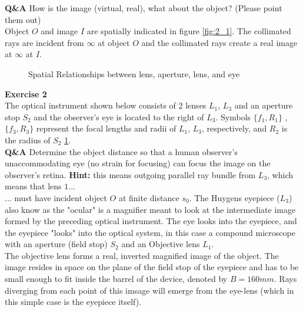 \documentclass[main.tex]{subfiles}
\begin{document}
\textbf{Q\&A} How is the image (virtual, real), what about the object? (Please point them out)\\

Object $O$ and image $I$ are spatially indicated in figure \ref{fig:2_1}. The collimated rays are incident from $\infty$ at object $O$ and the collimated rays create a real image at $\infty$ at $I$. 


\newpage

\begin{figure}
\centering{}
\caption{Spatial Relationships between lens, aperture, lens, and eye}
\label{fig:2_2}
\end{figure}

\textbf{Exercise 2}\\
The optical instrument shown below consists of 2 lenses $L_1$, $L_3$ and an aperture stop $S_2$ and the observer's eye is located to the right of $L_3$. Symbols $\{f_1 , R_1\}$ , $\{f_3 , R_3\}$ represent the focal lengths and radii of $L_1$, $L_3$, respectively, and $R_2$ is the radius of $S_2$ \ref{fig:2_2}.\\

\textbf{Q\&A} Determine the object distance so that a human observer's unaccommodating eye (no strain for focusing) can focus the image on the observer's retina. \textbf{Hint:} this means outgoing parallel ray bundle from $L_3$, which means that lens $1 ...$\\

... must have incident object $O$ at finite distance $s_0$. The Huygens eyepiece ($L_3$) also know as the "ocular" is a magnifier meant to look at the intermediate image formed by the preceding optical instrument. The eye looks into the eyepiece, and the eyepiece "looks" into the optical system, in this case a compound microscope with an aperture (field stop) $S_2$ and an Objective lens $L_1$.\\

The objective lens forms a real, inverted magnified image of the object. The image resides in space on the plane of the field stop of the eyepiece and has to be small enough to fit inside the barrel of the device, denoted by $B=160mm$. Rays diverging from each point of this imsage will emerge from the eye-lens (which in this simple case is the eyepiece itself).\\ 
\end{document}
